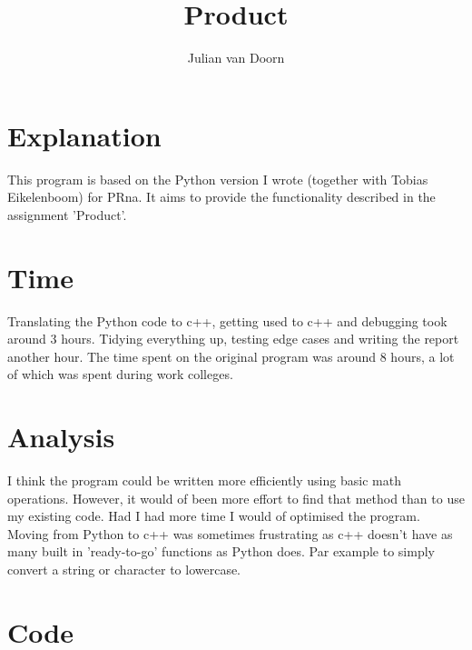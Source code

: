 \documentclass[10pt]{article}
\title{Product}
\author{Julian van Doorn}
\begin{document}

\maketitle

\section{Explanation}
This program is based on the Python version I wrote (together with Tobias Eikelenboom) for PRna. It aims to provide the functionality described in the assignment 'Product'.

\section{Time}
Translating the Python code to c++, getting used to c++ and debugging took around 3 hours. Tidying everything up, testing edge cases and writing the report another hour. The time spent on the original program was around 8 hours, a lot of which was spent during work colleges.

\section{Analysis}
I think the program could be written more efficiently using basic math operations. However, it would of been more effort to find that method than to use my existing code. Had I had more time I would of optimised the program. Moving from Python to c++ was sometimes frustrating as c++ doesn't have as many built in 'ready-to-go' functions as Python does. Par example to simply convert a string or character to lowercase.

\section*{Code}

\end{document}
